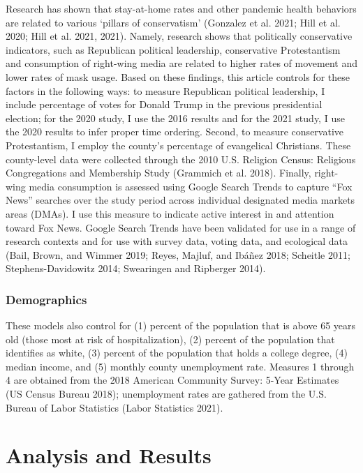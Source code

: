 Research has shown that stay-at-home rates and other pandemic health behaviors
are related to various `pillars of conservatism' (Gonzalez et al. 2021; Hill et al. 2020; Hill et al. 2021, 2021). Namely, research shows that politically conservative
indicators, such as Republican political leadership, conservative Protestantism
and consumption of right-wing media are related to higher rates of movement and
lower rates of mask usage. Based on these findings, this article controls for
these factors in the following ways: to measure Republican political leadership,
I include percentage of votes for Donald Trump in the previous presidential
election; for the 2020 study, I use the 2016 results and for the 2021 study, I
use the 2020 results to infer proper time ordering. Second, to measure
conservative Protestantism, I employ the county's percentage of evangelical
Christians. These county-level data were collected through the 2010 U.S.
Religion Census: Religious Congregations and Membership Study
(Grammich et al. 2018). Finally, right-wing media consumption is assessed using
Google Search Trends to capture ``Fox News'' searches over the study period across
individual designated media markets areas (DMAs). I use this measure to indicate
active interest in and attention toward Fox News. Google Search Trends have been
validated for use in a range of research contexts and for use with survey data,
voting data, and ecological data (Bail, Brown, and Wimmer 2019; Reyes, Majluf, and Ibáñez 2018; Scheitle 2011; Stephens-Davidowitz 2014; Swearingen and Ripberger 2014).

\hypertarget{demographics}{%
\subsubsection{Demographics}\label{demographics}}

These models also control for (1) percent of the population that is above 65
years old (those most at risk of hospitalization), (2) percent of the population
that identifies as white, (3) percent of the population that holds a college
degree, (4) median income, and (5) monthly county unemployment rate. Measures 1
through 4 are obtained from the 2018 American Community Survey: 5-Year Estimates
(US Census Bureau 2018); unemployment rates are gathered
from the U.S. Bureau of Labor Statistics (Labor Statistics 2021).

\hypertarget{analysis-and-results}{%
\section{Analysis and Results}\label{analysis-and-results}}

